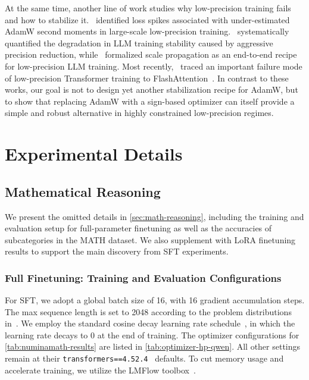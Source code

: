\documentclass{article}
\begin{document}
At the same time, another line of work studies why low-precision training fails and how to stabilize it.~\citet{wortsman2023stable} identified loss spikes associated with under-estimated AdamW second moments in large-scale low-precision training.~\citet{lee2024fp8} systematically quantified the degradation in LLM training stability caused by aggressive precision reduction, while~\citet{balancca2024scalify} formalized scale propagation as an end-to-end recipe for low-precision LLM training. Most recently,~\citet{qiu2026why} traced an important failure mode of low-precision Transformer training to FlashAttention~\citep{dao2022flashattention,daoICLR2024flashattention2,shah2024flashattention3}. In contrast to these works, our goal is not to design yet another stabilization recipe for AdamW, but to show that replacing AdamW with a sign-based optimizer can itself provide a simple and robust alternative in highly constrained low-precision regimes.

\section{Experimental Details}

\subsection{Mathematical Reasoning\label{sec:math-reasoning-cont}}

We present the omitted details in \cref{sec:math-reasoning}, including the training and evaluation setup for full-parameter finetuning as well as the accuracies of subcategories in the MATH dataset. We also supplement with LoRA finetuning results to support the main discovery from SFT experiments.

\subsubsection{Full Finetuning: Training and Evaluation Configurations\label{sec:sft-configuration}}

For SFT, we adopt a global batch size of 16, with 16 gradient accumulation steps. The max sequence length is set to 2048 according to the problem distributions in~\citet{numina_math_datasets}. We employ the standard cosine decay learning rate schedule~\citep{loshchilov2017sgdr}, in which the learning rate decays to 0 at the end of training. The optimizer configurations for \cref{tab:numinamath-results} are listed in \cref{tab:optimizer-hp-qwen}. All other settings remain at their \texttt{transformers==4.52.4}~\citep{wolf-etal-2020-transformers} defaults. To cut memory usage and accelerate training, we utilize the LMFlow toolbox~\citep{diao2024lmflow}.
\end{document}
